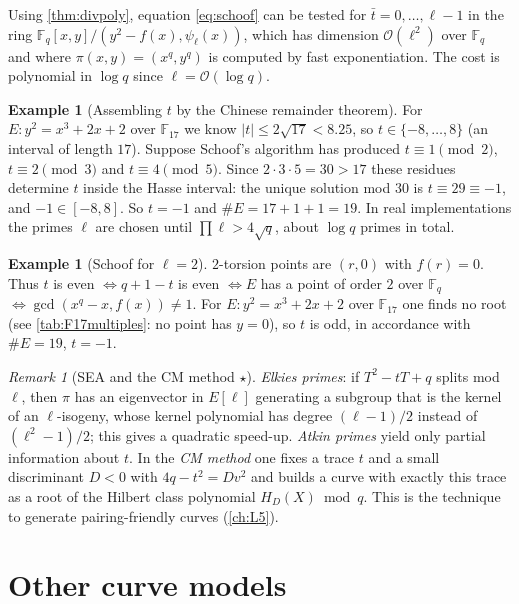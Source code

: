 \documentclass[11pt,a4paper,oneside]{book}
\theoremstyle{plain}
\theoremstyle{definition}
\newtheorem{example}[theorem]{Example}
\theoremstyle{remark}
\newtheorem{remark}[theorem]{Remark}
\newcommand{\F}{\mathbb{F}}
\newcommand{\Fq}{\mathbb{F}_q}
\newcommand{\bigO}{\mathcal{O}}
\begin{document}
Using \cref{thm:divpoly}, equation \eqref{eq:schoof} can be tested for $\bar t=0,\dots,\ell-1$ in the ring $\Fq[x,y]/(y^2-f(x),\psi_\ell(x))$, which has dimension $\bigO(\ell^2)$ over $\Fq$ and where $\pi(x,y)=(x^q,y^q)$ is computed by fast exponentiation. The cost is polynomial in $\log q$ since $\ell=\bigO(\log q)$.

\begin{example}[Assembling $t$ by the Chinese remainder theorem]
For $E:y^2=x^3+2x+2$ over $\F_{17}$ we know $|t|\le2\sqrt{17}<8.25$, so $t\in\{-8,\dots,8\}$ (an interval of length $17$). Suppose Schoof's algorithm has produced $t\equiv1\pmod2$, $t\equiv2\pmod3$ and $t\equiv4\pmod5$. Since $2\cdot3\cdot5=30>17$ these residues determine $t$ inside the Hasse interval: the unique solution mod $30$ is $t\equiv29\equiv-1$, and $-1\in[-8,8]$. So $t=-1$ and $\#E=17+1+1=19$. In real implementations the primes $\ell$ are chosen until $\prod\ell>4\sqrt q$, about $\log q$ primes in total.
\end{example}

\begin{example}[Schoof for $\ell=2$]
$2$-torsion points are $(r,0)$ with $f(r)=0$. Thus $t$ is even $\iff q+1-t$ is even $\iff E$ has a point of order $2$ over $\Fq$ $\iff\gcd(x^q-x,f(x))\ne1$.
For $E:y^2=x^3+2x+2$ over $\F_{17}$ one finds no root (see \cref{tab:F17multiples}: no point has $y=0$), so $t$ is odd, in accordance with $\#E=19$, $t=-1$.
\end{example}

\begin{remark}[SEA and the CM method $\star$]
\emph{Elkies primes}: if $T^2-tT+q$ splits mod $\ell$, then $\pi$ has an eigenvector in $E[\ell]$ generating a subgroup that is the kernel of an $\ell$-isogeny, whose kernel polynomial has degree $(\ell-1)/2$ instead of $(\ell^2-1)/2$; this gives a quadratic speed-up. \emph{Atkin primes} yield only partial information about $t$. In the \emph{CM method} one fixes a trace $t$ and a small discriminant $D<0$ with $4q-t^2=Dv^2$ and builds a curve with exactly this trace as a root of the Hilbert class polynomial $H_D(X)\bmod q$. This is the technique to generate pairing-friendly curves (\cref{ch:L5}).
\end{remark}

\section{Other curve models}\label{sec:models}
\end{document}
